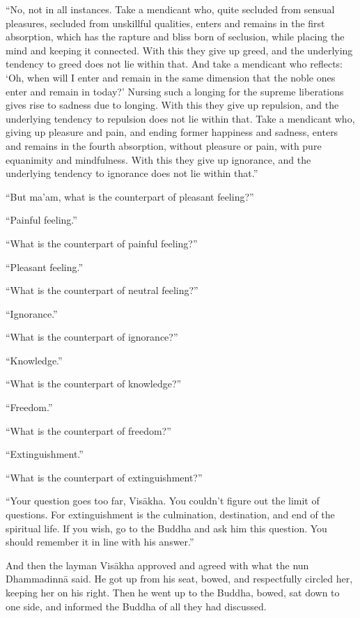 \documentclass[12pt,openany]{book}%
\begin{document}
“No, not in all instances. Take a mendicant who, quite secluded from sensual pleasures, secluded from unskillful qualities, enters and remains in the first absorption, which has the rapture and bliss born of seclusion, while placing the mind and keeping it connected. With this they give up greed, and the underlying tendency to greed does not lie within that. And take a mendicant who reflects: ‘Oh, when will I enter and remain in the same dimension that the noble ones enter and remain in today?’ Nursing such a longing for the supreme liberations gives rise to sadness due to longing. With this they give up repulsion, and the underlying tendency to repulsion does not lie within that. Take a mendicant who, giving up pleasure and pain, and ending former happiness and sadness, enters and remains in the fourth absorption, without pleasure or pain, with pure equanimity and mindfulness. With this they give up ignorance, and the underlying tendency to ignorance does not lie within that.” 

“But ma’am, what is the counterpart of pleasant feeling?” 

“Painful feeling.” 

“What is the counterpart of painful feeling?” 

“Pleasant feeling.” 

“What is the counterpart of neutral feeling?” 

“Ignorance.” 

“What is the counterpart of ignorance?” 

“Knowledge.” 

“What is the counterpart of knowledge?” 

“Freedom.” 

“What is the counterpart of freedom?” 

“Extinguishment.” 

“What is the counterpart of extinguishment?” 

“Your question goes too far, \textsanskrit{Visākha}. You couldn’t figure out the limit of questions. For extinguishment is the culmination, destination, and end of the spiritual life. If you wish, go to the Buddha and ask him this question. You should remember it in line with his answer.” 

And then the layman \textsanskrit{Visākha} approved and agreed with what the nun \textsanskrit{Dhammadinnā} said. He got up from his seat, bowed, and respectfully circled her, keeping her on his right. Then he went up to the Buddha, bowed, sat down to one side, and informed the Buddha of all they had discussed. 
\end{document}
